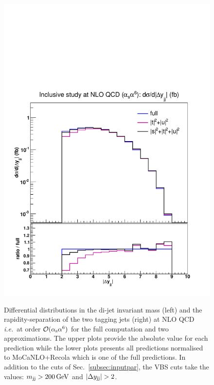 \begin{figure}[hbt]
{\includegraphics[scale=0.35]{figures/scanfigures/dyjj_nlo.pdf}}
\caption{
Differential distributions in the di-jet invariant mass (left) and the rapidity-separation of the two tagging jets (right) at NLO QCD \emph{i.e.}\ at order $\mathcal{O}(\alpha_\text{s}\alpha^6)$ for the full computation and two approximations.
The upper plots provide the absolute value for each prediction while the lower plots presents all predictions normalised to {\sc MoCaNLO}+{\sc Recola} which is one of the full predictions.
In addition to the cuts of Sec.~\ref{subsec:inputpar}, the VBS cuts take the values: $m_{\text{j}\text{j}}>200 \,\text{GeV}$ and $|\Delta y_{\Pj\Pj}|>2$.} 
\label{fig:mjjdyjj_1d_1}
\end{figure}


